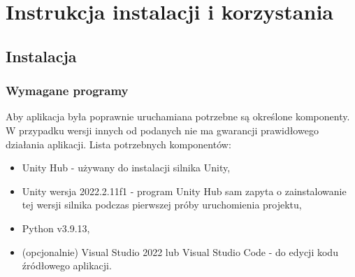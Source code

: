 \documentclass{SGGW-thesis}
\begin{document}
\chapter{Instrukcja instalacji i korzystania}
\section{Instalacja}
\subsection{Wymagane programy}
Aby aplikacja była poprawnie uruchamiana potrzebne są określone komponenty. W przypadku wersji innych od podanych nie ma gwarancji prawidłowego działania aplikacji.
Lista potrzebnych komponentów:
\begin{itemize}
  \item{Unity Hub - używany do instalacji silnika Unity},
  \item{Unity wersja 2022.2.11f1 - program Unity Hub sam zapyta o zainstalowanie tej wersji silnika podczas pierwszej próby uruchomienia projektu},
  \item{Python v3.9.13},
  \item{(opcjonalnie) Visual Studio 2022 lub Visual Studio Code - do edycji kodu źródłowego aplikacji}.
\end{itemize}
\end{document}
